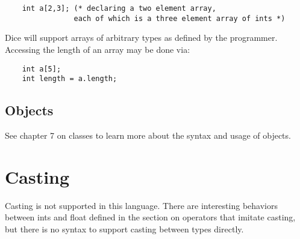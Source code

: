 \begin{homeworkProblem}
	\begin{verbatim}
	int a[2,3]; (* declaring a two element array,
				each of which is a three element array of ints *)
	\end{verbatim}
	
	Dice will support arrays of arbitrary types as defined by the programmer. Accessing the length of an array may be done via:
	\begin{verbatim}
	int a[5];
	int length = a.length;
	\end{verbatim}
	
	\subsection{Objects}
	
	See chapter 7 on classes to learn more about the syntax and usage of objects.

	\section{Casting}
	Casting is not supported in this language. There are interesting behaviors between ints and float defined in the section on operators that imitate casting, but there is no syntax to support casting between types directly. 

\end{homeworkProblem}
